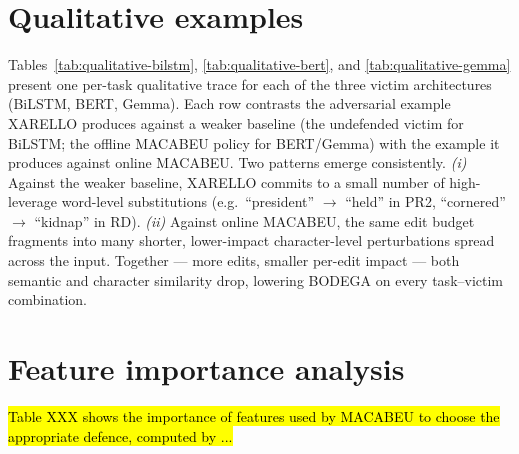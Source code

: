 \documentclass[11pt]{article}
\begin{document}
\section{Qualitative examples}
\label{sec:appendix-extra-figs}

Tables~\ref{tab:qualitative-bilstm}, \ref{tab:qualitative-bert}, and \ref{tab:qualitative-gemma} present one per-task qualitative trace for each of the three victim architectures (BiLSTM, BERT, Gemma). Each row contrasts the adversarial example XARELLO produces against a weaker baseline (the undefended victim for BiLSTM; the offline MACABEU policy for BERT/Gemma) with the example it produces against online MACABEU. Two patterns emerge consistently. \emph{(i)} Against the weaker baseline, XARELLO commits to a small number of high-leverage word-level substitutions (e.g.\ ``president'' $\to$ ``held'' in PR2, ``cornered'' $\to$ ``kidnap'' in RD). \emph{(ii)} Against online MACABEU, the same edit budget fragments into many shorter, lower-impact character-level perturbations spread across the input. Together --- more edits, smaller per-edit impact --- both semantic and character similarity drop, lowering BODEGA on every task--victim combination.








\section{Feature importance analysis}
\label{sec:featureimportance}
\hl{Table XXX shows the importance of features used by MACABEU to choose the appropriate defence, computed by ...}
\end{document}
